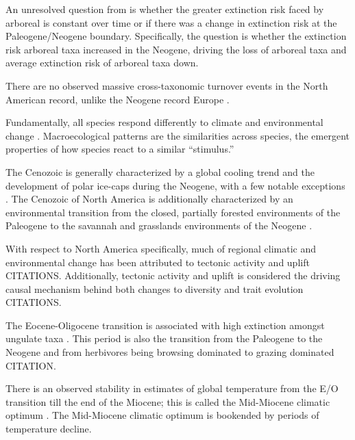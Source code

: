 \documentclass[12pt,letterpaper]{article}
\begin{document}
An unresolved question from \citet{Smits2015b} is whether the greater extinction risk faced by arboreal is constant over time or if there was a change in extinction risk at the Paleogene/Neogene boundary. Specifically, the question is whether the extinction risk arboreal taxa increased in the Neogene, driving the loss of arboreal taxa and average extinction risk of arboreal taxa down. 

There are no observed massive cross-taxonomic turnover events in the North American record, unlike the Neogene record Europe \citep{Alroy2009,Alroy1996a,Eronen2015,Janis1993b,Alroy2000g}.




Fundamentally, all species respond differently to climate and environmental change \citep{Blois2009}. Macroecological patterns are the similarities across species, the emergent properties of how species react to a similar ``stimulus.''

The Cenozoic is generally characterized by a global cooling trend and the development of polar ice-caps during the Neogene, with a few notable exceptions \citep{Zachos2001,Zachos2008,Cramer2011}. The Cenozoic of North America is additionally characterized by an environmental transition from the closed, partially forested environments of the Paleogene to the savannah and grasslands environments of the Neogene \citep{Blois2009,Janis1993b,Janis2000,Stromberg2005}.

With respect to North America specifically, much of regional climatic and environmental change has been attributed to tectonic activity and uplift \citep{Blois2009,Eronen2015,Janis2008a,Badgley2013} CITATIONS. Additionally, tectonic activity and uplift is considered the driving causal mechanism behind both changes to diversity and trait evolution \citep{Blois2009,Badgley2013} CITATIONS.

The Eocene-Oligocene transition is associated with high extinction amongst ungulate taxa \citep{Janis2008a}. This period is also the transition from the Paleogene to the Neogene and from herbivores being browsing dominated to grazing dominated CITATION.

There is an observed stability in estimates of global temperature from the E/O transition till the end of the Miocene; this is called the Mid-Miocene climatic optimum \citep{Zachos2001,Zachos2008}. The Mid-Miocene climatic optimum is bookended by periods of temperature decline.
\end{document}
